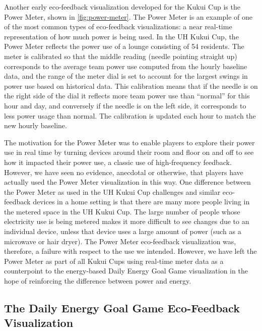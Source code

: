 \documentclass{sigchi}
\begin{document}
Another early eco-feedback visualization developed for the Kukui Cup is the Power Meter, shown in \autoref{fig:power-meter}. The Power Meter is an example of one of the most common types of eco-feedback visualizations: a near real-time representation of how much power is being used. In the UH Kukui Cup, the Power Meter reflects the power use of a lounge consisting of 54 residents. The meter is calibrated so that the middle reading (needle pointing straight up) corresponds to the average team power use computed from the hourly baseline data, and the range of the meter dial is set to account for the largest swings in power use based on historical data. This calibration means that if the needle is on the right side of the dial it reflects more team power use than ``normal'' for this hour and day, and conversely if the needle is on the left side, it corresponds to less power usage than normal. The calibration is updated each hour to match the new hourly baseline.

The motivation for the Power Meter was to enable players to explore their power use in real time by turning devices around their room and floor on and off to see how it impacted their power use, a classic use of high-frequency feedback. However, we have seen no evidence, anecdotal or otherwise, that players have actually used the Power Meter visualization in this way. One difference between the Power Meter as used in the UH Kukui Cup challenges and similar eco-feedback devices in a home setting is that there are many more people living in the metered space in the UH Kukui Cup. The large number of people whose electricity use is being metered makes it more difficult to see changes due to an individual device, unless that device uses a large amount of power (such as a microwave or hair dryer). The Power Meter eco-feedback visualization was, therefore, a failure with respect to the use we intended. However, we have left the Power Meter as part of all Kukui Cups using real-time meter data as a counterpoint to the energy-based Daily Energy Goal Game visualization in the hope of reinforcing the difference between power and energy.

\subsection{The Daily Energy Goal Game Eco-Feedback Visualization}
\end{document}
